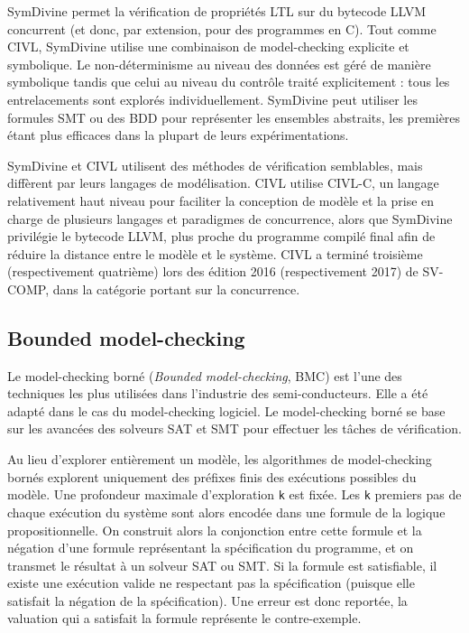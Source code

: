 SymDivine\cite{SymDivine} permet la vérification de propriétés LTL sur du
bytecode LLVM concurrent (et donc, par extension, pour des programmes en C).
Tout comme CIVL, SymDivine utilise une combinaison de model-checking explicite
et symbolique. Le non-déterminisme au niveau des données est géré de manière
symbolique tandis que celui au niveau du contrôle traité explicitement : tous
les entrelacements sont explorés individuellement. SymDivine peut utiliser les
formules SMT ou des BDD pour représenter les ensembles abstraits, les premières
étant plus efficaces dans la plupart de leurs expérimentations.

SymDivine et CIVL utilisent des méthodes de vérification semblables, mais
diffèrent par leurs langages de modélisation. CIVL utilise CIVL-C, un langage
relativement haut niveau pour faciliter la conception de modèle et la prise en
charge de plusieurs langages et paradigmes de concurrence, alors que SymDivine
privilégie le bytecode LLVM, plus proche du programme compilé final afin de
réduire la distance entre le modèle et le système. CIVL a terminé troisième
(respectivement quatrième) lors des édition 2016 (respectivement 2017) de
SV-COMP\cite{svcomp_2016_result, svcomp_2017_result}, dans la catégorie portant
sur la concurrence.

\subsection{Bounded model-checking}

Le model-checking borné (\emph{Bounded model-checking}, BMC) est l'une des
techniques les plus utilisées dans l'industrie des semi-conducteurs. Elle a été
adapté dans le cas du model-checking logiciel. Le model-checking borné se base
sur les avancées des solveurs SAT et SMT pour effectuer les tâches de
vérification.

Au lieu d'explorer entièrement un modèle, les algorithmes de model-checking
bornés explorent uniquement des préfixes finis des exécutions possibles du
modèle. Une profondeur maximale d'exploration \lstinline!k! est fixée.
Les \lstinline!k! premiers pas de chaque exécution du système sont alors
encodée dans une formule de la logique propositionnelle.
On construit alors la conjonction entre cette formule et la négation d'une
formule représentant la spécification du programme, et on transmet le résultat
à un solveur SAT ou SMT. Si la formule est satisfiable, il existe une
exécution valide ne respectant pas la spécification (puisque elle satisfait la
négation de la spécification). Une erreur est donc reportée, la valuation qui a
satisfait la formule représente le contre-exemple.

